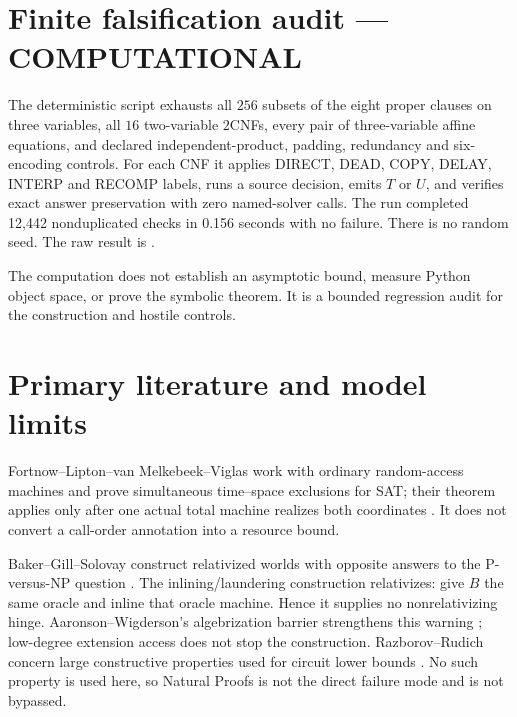 \documentclass[11pt]{article}
\newcommand{\COMP}{\textbf{COMPUTATIONAL}}
\begin{document}
\section{Finite falsification audit --- \COMP}

The deterministic script
 exhausts all
$256$ subsets of the eight proper clauses on three variables, all $16$
two-variable $2$CNFs, every pair of three-variable affine equations, and
declared independent-product, padding, redundancy and six-encoding controls.
For each CNF it applies DIRECT, DEAD, COPY, DELAY, INTERP and RECOMP labels,
runs a source decision, emits $T$ or $U$, and verifies exact answer
preservation with zero named-solver calls.  The run completed 12,442
nonduplicated checks in 0.156 seconds with no failure.  There is no random
seed.  The raw result is
.

The computation does not establish an asymptotic bound, measure Python object
space, or prove the symbolic theorem.  It is a bounded regression audit for
the construction and hostile controls.

\section{Primary literature and model limits}

Fortnow--Lipton--van Melkebeek--Viglas work with ordinary random-access
machines and prove simultaneous time--space exclusions for SAT; their theorem
applies only after one actual total machine realizes both coordinates
\cite{FLMV}.  It does not convert a call-order annotation into a resource
bound.

Baker--Gill--Solovay construct relativized worlds with opposite answers to
the P-versus-NP question \cite{BGS}.  The inlining/laundering construction
relativizes: give $B$ the same oracle and inline that oracle machine.  Hence it
supplies no nonrelativizing hinge.  Aaronson--Wigderson's algebrization barrier
strengthens this warning \cite{AW}; low-degree extension access does not stop
the construction.  Razborov--Rudich concern large constructive properties
used for circuit lower bounds \cite{RR}.  No such property is used here, so
Natural Proofs is not the direct failure mode and is not bypassed.
\end{document}
